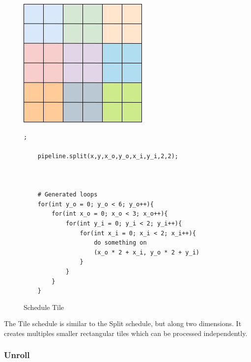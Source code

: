 \begin{figure}[H]

		\begin{minipage}[c]{\EIW}
			\centering
		\includegraphics[width=\textwidth]{Images/Tile.png}
		\end{minipage}
		\begin{minipage}[c]{\ECW}
			\centering
			\begin{lstlisting}[label={code:reorder}];

	pipeline.split(x,y,x_o,y_o,x_i,y_i,2,2);



	# Generated loops
	for(int y_o = 0; y_o < 6; y_o++){
		for(int x_o = 0; x_o < 3; x_o++){
			for(int y_i = 0; y_i < 2; y_i++){
				for(int x_i = 0; x_i < 2; x_i++){
					do something on
					(x_o * 2 + x_i, y_o * 2 + y_i)
				}
			}
		}
	}
\end{lstlisting}
		\end{minipage}
		\caption{Schedule Tile}
		\label{schedule:tile}
\end{figure}
	The Tile schedule is similar to the Split schedule, but along two dimensions. It creates multiples smaller rectangular tiles which can be processed independently.

	\subsubsection{Unroll}


